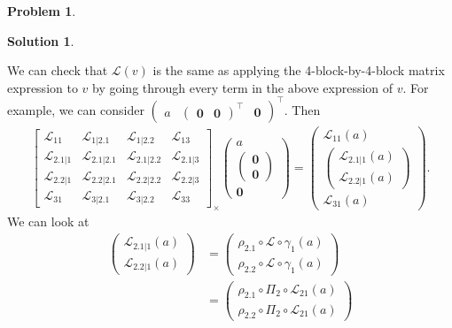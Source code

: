 \documentclass{article}
\theoremstyle{definition}
\newtheorem*{prob*}{Problem}
\newtheorem*{sln*}{Solution}
\newcommand{\lag}{\mathcal{L}}
\begin{document}
\begin{prob*}
\begin{sln*}
\begin{enumerate}
		We can check that $\lag(v)$ is the same as applying the 4-block-by-4-block matrix expression to $v$ by going through every term in the above expression of $v$. For example, we can consider $\begin{pmatrix}
		a & \begin{pmatrix}
		\mathbf{0} & \mathbf{0}
		\end{pmatrix}^\top & \mathbf{0}
		\end{pmatrix}^\top$. Then
		\begin{align*}
		\begin{bmatrix}
		\lag_{11} & \lag_{1|2.1} & \lag_{1|2.2} & \lag_{13}\\
		\lag_{2.1|1} & \lag_{2.1|2.1} & \lag_{2.1|2.2} & \lag_{2.1|3}\\
		\lag_{2.2|1} & \lag_{2.2|2.1} & \lag_{2.2|2.2} & \lag_{2.2|3}\\
		\lag_{31} & \lag_{3|2.1} & \lag_{3|2.2} & \lag_{33}
		\end{bmatrix}_\times \begin{pmatrix}
		a \\ \begin{pmatrix}
		\mathbf{0}\\\mathbf{0}
		\end{pmatrix}\\
		\mathbf{0}
		\end{pmatrix} = \begin{pmatrix}
		\lag_{11}(a)\\
		\begin{pmatrix}
		\lag_{2.1|1}(a)\\
		\lag_{2.2|1}(a)
		\end{pmatrix}\\
		\lag_{31}(a)
		\end{pmatrix}.
		\end{align*}
		We can look at 
		\begin{align*}
		\begin{pmatrix}
		\lag_{2.1|1}(a)\\
		\lag_{2.2|1}(a)
		\end{pmatrix} &= 
		\begin{pmatrix}
		\rho_{2.1} \circ  \lag \circ \gamma_1(a)\\
		\rho_{2.2} \circ  \lag \circ \gamma_1(a)
		\end{pmatrix}\\
		&=
		\begin{pmatrix}
		\rho_{2.1} \circ \Pi_2 \circ \lag_{21}(a)\\
		\rho_{2.2} \circ \Pi_2 \circ \lag_{21}(a)

\end{pmatrix}
\end{align*}
\end{enumerate}
\end{sln*}
\end{prob*}
\end{document}
